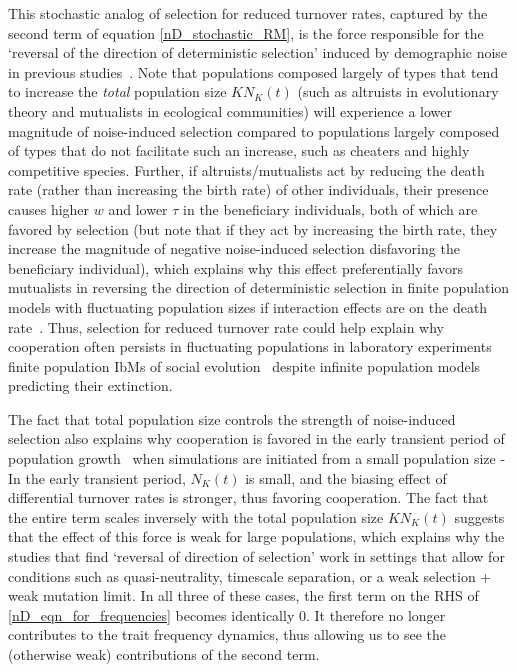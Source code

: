This stochastic analog of selection for reduced turnover rates, captured by the second term of equation \eqref{nD_stochastic_RM}, is the force responsible for the `reversal of the direction of deterministic selection' induced by demographic noise in previous studies~\citep{houchmandzadeh_selection_2012, houchmandzadeh_fluctuation_2015, constable_demographic_2016,veller_drift-induced_2017, mcleod_social_2019}. Note that populations composed largely of types that tend to increase the \emph{total} population size $KN_K(t)$ (such as altruists in evolutionary theory and mutualists in ecological communities) will experience a lower magnitude of noise-induced selection compared to populations largely composed of types that do not facilitate such an increase, such as cheaters and highly competitive species. Further, if altruists/mutualists act by reducing the death rate (rather than increasing the birth rate) of other individuals, their presence causes higher $w$ and lower $\tau$ in the beneficiary individuals, both of which are favored by selection (but note that if they act by increasing the birth rate, they increase the magnitude of negative noise-induced selection disfavoring the beneficiary individual), which explains why this effect preferentially favors mutualists in reversing the direction of deterministic selection in finite population models with fluctuating population sizes if interaction effects are on the death rate~\citep{mcleod_social_2019}. Thus, selection for reduced turnover rate could help explain why cooperation often persists in fluctuating populations in laboratory experiments~\citep{sanchez_feedback_2013} finite population IbMs of social evolution~\citep{houchmandzadeh_selection_2012,houchmandzadeh_fluctuation_2015,chotibut_evolutionary_2015,behar_fluctuations-induced_2016,mcavoy_public_2018,mcleod_social_2019} despite infinite population models predicting their extinction.

The fact that total population size controls the strength of noise-induced selection also explains why cooperation is favored in the early transient period of population growth~\citep{melbinger_evolutionary_2010} when simulations are initiated from a small population size - In the early transient period, $N_K(t)$ is small, and the biasing effect of differential turnover rates is stronger, thus favoring cooperation. The fact that the entire term scales inversely with the total population size $KN_K(t)$ suggests that the effect of this force is weak for large populations, which explains why the studies that find `reversal of direction of selection' work in settings that allow for conditions such as quasi-neutrality, timescale separation, or a weak selection + weak mutation limit. In all three of these cases, the first term on the RHS of \eqref{nD_eqn_for_frequencies} becomes identically 0. It therefore no longer contributes to the trait frequency dynamics, thus allowing us to see the (otherwise weak) contributions of the second term.

